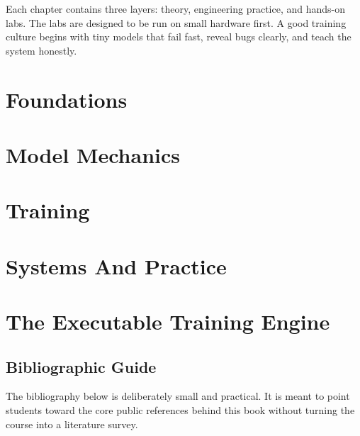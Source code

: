 \documentclass[11pt,oneside]{book}
\begin{document}
Each chapter contains three layers: theory, engineering practice, and hands-on labs. The labs are designed to be run on small hardware first. A good training culture begins with tiny models that fail fast, reveal bugs clearly, and teach the system honestly.

\mainmatter

\part{Foundations}




\part{Model Mechanics}





\part{Training}




\part{Systems And Practice}






\part{The Executable Training Engine}



\backmatter
\chapter*{Bibliographic Guide}
The bibliography below is deliberately small and practical. It is meant to point students toward the core public references behind this book without turning the course into a literature survey.
\end{document}
